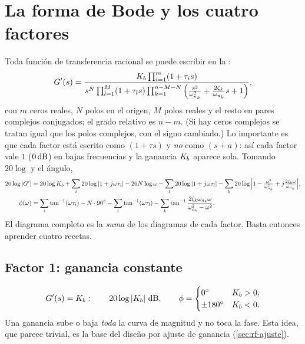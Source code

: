 \section{La forma de Bode y los cuatro factores}
\label{sec:rf-factores}

Toda función de transferencia racional se puede escribir en la :
\begin{equation}
  G'(s)=\frac{K_b\prod_{i=1}^{m}(1+\tau_i s)}
  {s^N\prod_{l=1}^{M}(1+\tau_l s)\prod_{k=1}^{n-M-N}\Big(\frac{s^2}{\omega_{n_k}^2}+\frac{2\zeta_k}{\omega_{n_k}}s+1\Big)},
  \label{eq:rf-formabode}
\end{equation}
con $m$ ceros reales, $N$ polos en el origen, $M$ polos reales y el resto en pares complejos conjugados; el grado relativo es $n-m$. (Si hay ceros complejos se tratan igual que los polos complejos, con el signo cambiado.) Lo importante es que cada factor está escrito como $(1+\tau s)$ y \emph{no} como $(s+a)$: así cada factor vale $1$ ($0\,\mathrm{dB}$) en bajas frecuencias y la ganancia $K_b$ aparece sola. Tomando $20\log$ y el ángulo,
\begin{align}
  20\log|G'|&=20\log K_b+\sum_i 20\log|1+j\omega\tau_i|-20N\log\omega
  -\sum_l 20\log|1+j\omega\tau_l|-\sum_k 20\log\Big|1-\tfrac{\omega^2}{\omega_{n_k}^2}+j\tfrac{2\zeta_k\omega}{\omega_{n_k}}\Big|,\notag\\
  \phi(\omega)&=\sum_i\tan^{-1}(\omega\tau_i)-N\cdot 90^{\circ}
  -\sum_l\tan^{-1}(\omega\tau_l)
  -\sum_k\tan^{-1}\frac{2\zeta_k\omega_{n_k}\omega}{\omega_{n_k}^2-\omega^2}.
  \label{eq:rf-sumas}
\end{align}
El diagrama completo es la \emph{suma} de los diagramas de cada factor. Basta entonces aprender cuatro recetas.

\subsection{Factor 1: ganancia constante}
\[
  \Gma(s)=\Kb:\qquad 20\log|\Kb|\ \text{dB},\qquad
  \phi=\begin{cases}0\grados & \Kb>0,\\ \pm180\grados & \Kb<0.\end{cases}
\]
Una ganancia sube o baja \emph{toda} la curva de magnitud y no toca la fase. Esta idea, que parece trivial, es la base del diseño por ajuste de ganancia (\cref{sec:rf-ajuste}).

